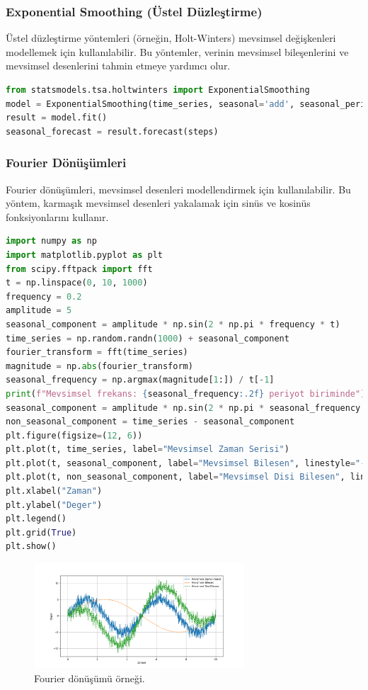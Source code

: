 \subsubsection{Exponential Smoothing (Üstel Düzleştirme)}

Üstel düzleştirme yöntemleri (örneğin, Holt-Winters) mevsimsel değişkenleri modellemek için kullanılabilir. Bu yöntemler, verinin mevsimsel bileşenlerini ve mevsimsel desenlerini tahmin etmeye yardımcı olur.

\begin{lstlisting}[language=Python]
from statsmodels.tsa.holtwinters import ExponentialSmoothing
model = ExponentialSmoothing(time_series, seasonal='add', seasonal_periods=12)
result = model.fit()
seasonal_forecast = result.forecast(steps)
\end{lstlisting}

\subsubsection{Fourier Dönüşümleri}

Fourier dönüşümleri, mevsimsel desenleri modellendirmek için kullanılabilir. Bu yöntem, karmaşık mevsimsel desenleri yakalamak için sinüs ve kosinüs fonksiyonlarını kullanır.

\begin{lstlisting}[language=Python]
import numpy as np
import matplotlib.pyplot as plt
from scipy.fftpack import fft
t = np.linspace(0, 10, 1000) 
frequency = 0.2 
amplitude = 5
seasonal_component = amplitude * np.sin(2 * np.pi * frequency * t)
time_series = np.random.randn(1000) + seasonal_component
fourier_transform = fft(time_series)
magnitude = np.abs(fourier_transform)
seasonal_frequency = np.argmax(magnitude[1:]) / t[-1]
print(f"Mevsimsel frekans: {seasonal_frequency:.2f} periyot biriminde")
seasonal_component = amplitude * np.sin(2 * np.pi * seasonal_frequency * t)
non_seasonal_component = time_series - seasonal_component
plt.figure(figsize=(12, 6))
plt.plot(t, time_series, label="Mevsimsel Zaman Serisi")
plt.plot(t, seasonal_component, label="Mevsimsel Bilesen", linestyle="--")
plt.plot(t, non_seasonal_component, label="Mevsimsel Disi Bilesen", linestyle="--")
plt.xlabel("Zaman")
plt.ylabel("Deger")
plt.legend()
plt.grid(True)
plt.show()
\end{lstlisting}

\begin{figure}[h]
    \centering
    \includegraphics[width=0.7\textwidth]{images/fourier.png}
    \caption{Fourier dönüşümü örneği.}
    \label{fig:enter-label}
\end{figure}

